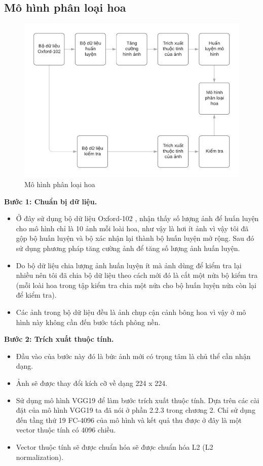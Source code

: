 \documentclass[12pt]{report}
\begin{document}
										
		\newpage
		\subsection{Mô hình phân loại hoa}
		\begin{figure}[h]
			\centering
			\includegraphics[scale=0.4]{mohinh_phanloai}
			\caption{Mô hình phân loại hoa}
			\label{fig:mohinh_phanloai}
		\end{figure}
										
		\textbf{Bước 1: Chuẩn bị dữ liệu.} 
		\begin{itemize}
			\item Ở đây sử dụng bộ dữ liệu Oxford-102 \cite{cia-Nilsback06}, nhận thấy số lượng ảnh để huấn luyện cho mô hình chỉ là 10 ảnh mỗi loài hoa, như vậy là hơi ít ảnh vì vậy tôi đã gộp bộ huấn luyện và bộ xác nhận lại thành bộ huấn luyện mở rộng. Sau đó sử dụng phương pháp tăng cường ảnh \cite{cia_image_augmentation_2} để tăng số lượng ảnh huấn luyện.
			\item Do bộ dữ liệu chia lượng ảnh huấn luyện ít mà ảnh dùng để kiểm tra lại nhiều nên tôi đã chia bộ dữ liệu theo cách mới đó là cắt một nửa bộ kiểm tra (mỗi loài hoa trong tập kiểm tra chia một nửa cho bộ huấn luyện nửa còn lại để kiểm tra).
			\item Các ảnh trong bộ dữ liệu đều là ảnh chụp cận cảnh bông hoa vì vậy ở mô hình này không cần đến bước tách phông nền.
		\end{itemize}
										
		\textbf{Bước 2: Trích xuất thuộc tính.} 
		\begin{itemize}
			\item Đầu vào của bước này đó là bức ảnh mới có trọng tâm là chủ thể cần nhận dạng.
			\item Ảnh sẽ được thay đổi kích cỡ về dạng 224 x 224.
			\item Sử dụng mô hình VGG19 \cite{cia_vgg19} để làm bước trích xuất thuộc tính. Dựa trên các cài đặt của mô hình VGG19 \cite{cia_vgg19} ta đã nói ở phần 2.2.3 trong chương 2. Chỉ sử dụng đến tầng thứ 19 FC-4096 của mô hình và kết quả thu được ở đây là một vector thuộc tính có 4096 chiều.
			\item Vector thuộc tính sẽ được chuẩn hóa sẽ được chuẩn hóa L2 (L2 normalization).
		\end{itemize}
										
\end{document}
